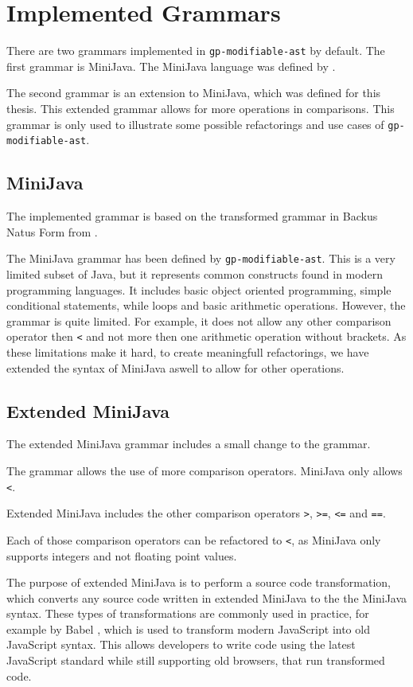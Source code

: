
\section{Implemented Grammars}

There are two grammars implemented in \verb|gp-modifiable-ast| by default. 
The first grammar is MiniJava. The MiniJava language was defined by \cite{Appel2002-kleene}. 

The second grammar is an extension to MiniJava, which was defined for this thesis. This extended grammar allows for more operations in comparisons.
This grammar is only used to illustrate some possible refactorings and use cases of \verb|gp-modifiable-ast|.

\subsection{MiniJava}

The implemented grammar is based on the transformed grammar in Backus Natus Form from \cite{minijava_bnf}.

The MiniJava grammar has been defined by \verb|gp-modifiable-ast|. 
This is a very limited subset of Java, but it represents common constructs found in modern programming languages.
It includes basic object oriented programming, simple conditional statements, while loops and basic arithmetic operations. 
However, the grammar is quite limited. For example, it does not allow any other comparison operator then \lstinline|<| and not more 
then one arithmetic operation without brackets. As these limitations make it hard, to create meaningfull refactorings, we have extended
the syntax of MiniJava aswell to allow for other operations.

\subsection{Extended MiniJava}

The extended MiniJava grammar includes a small change to the grammar.

The grammar allows the use of more comparison operators. MiniJava only allows \lstinline|<|.

Extended MiniJava includes the other comparison operators \lstinline|>|, \lstinline|>=|, \lstinline|<=| and \lstinline|==|.

Each of those comparison operators can be refactored to \lstinline|<|, as MiniJava only supports integers and not floating point values.

The purpose of extended MiniJava is to perform a source code transformation, which converts any source code written in extended MiniJava to the
the MiniJava syntax. These types of transformations are commonly used in practice, for example by Babel \cite{babeljs}, which is used to transform
modern JavaScript into old JavaScript syntax. This allows developers to write code using the latest JavaScript standard while still supporting old browsers,
that run transformed code.